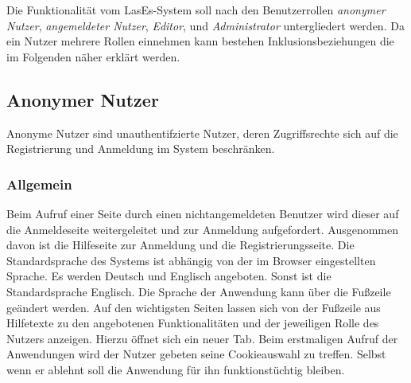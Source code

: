 Die Funktionalität vom LasEs-System soll nach den Benutzerrollen
\textit{anonymer Nutzer}, \textit{angemeldeter Nutzer}, \textit{Editor}, und
\textit{Administrator} untergliedert werden. Da ein Nutzer mehrere Rollen einnehmen
kann bestehen Inklusionsbeziehungen die im Folgenden näher erklärt werden.

\subsection{Anonymer Nutzer}
Anonyme Nutzer sind unauthentifzierte Nutzer, deren Zugriffsrechte sich
auf die Registrierung und Anmeldung im System beschränken.

\subsubsection{Allgemein}
\begin{description}
     Beim Aufruf einer Seite durch einen nichtangemeldeten Benutzer
    wird dieser auf die Anmeldeseite weitergeleitet und zur
    Anmeldung aufgefordert. Ausgenommen davon ist die Hilfeseite zur Anmeldung und die
    Registrierungsseite.
     Die Standardsprache des Systems ist abhängig von der im Browser
    eingestellten Sprache. Es werden Deutsch und Englisch angeboten.
    Sonst ist die Standardsprache Englisch. Die Sprache der Anwendung kann über die
    Fußzeile geändert werden.
     Auf den wichtigsten Seiten lassen sich von der Fußzeile aus
    Hilfetexte zu den angebotenen Funktionalitäten und der jeweiligen Rolle
    des Nutzers anzeigen. Hierzu öffnet sich ein neuer Tab.
     Beim erstmaligen Aufruf der Anwendungen wird der Nutzer gebeten
    seine Cookieauswahl zu treffen. Selbst wenn er ablehnt soll die Anwendung
    für ihn funktionstüchtig bleiben.
\end{description}

